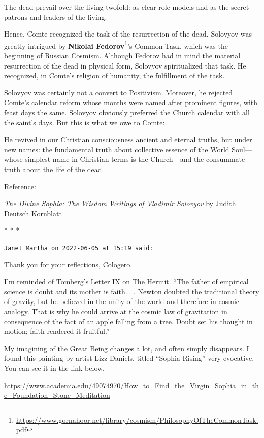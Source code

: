\begin{quotex}
The dead prevail over the living twofold: as clear role models and as the secret patrons and leaders of the living.
\end{quotex}


Hence, Comte recognized the task of the resurrection of the dead. Solovyov was greatly intrigued by \textbf{Nikolai Fedorov}\footnote{\url{https://www.gornahoor.net/library/cosmism/PhilosophyOfTheCommonTask.pdf}}'s Common Task, which was the beginning of Russian Cosmism. Although Fedorov had in mind the material resurrection of the dead in physical form, Solovyov spiritualized that task. He recognized, in Comte's religion of humanity, the fulfillment of the task.

Solovyov was certainly not a convert to Positivism. Moreover, he rejected Comte's calendar reform whose months were named after prominent figures, with feast days the same. Solovyov obviously preferred the Church calendar with all the saint's days. But this is what we owe to Comte:

\begin{quotex}
He revived in our Christian consciousness ancient and eternal truths, but under new names: the fundamental truth about collective essence of the World Soul---whose simplest name in Christian terms is the Church---and the consummate truth about the life of the dead.
\end{quotex}

Reference:

\textit{The Divine Sophia: The Wisdom Writings of Vladimir Solovyov} by Judith Deutsch Kornblatt



\begin{center}* * *\end{center}

\begin{footnotesize}
\begin{sffamily}
\texttt{Janet Martha on 2022-06-05 at 15:19 said:}

Thank you for your reflections, Cologero.

I'm reminded of Tomberg's Letter IX on The Hermit. ``The father of empirical science is doubt and its mother is faith... . Newton doubted the traditional theory of gravity, but he believed in the unity of the world and therefore in cosmic analogy. That is why he could arrive at the cosmic law of gravitation in consequence of the fact of an apple falling from a tree. Doubt set his thought in motion; faith rendered it fruitful.''

My imagining of the Great Being changes a lot, and often simply disappears. I found this painting by artist Lizz Daniels, titled ``Sophia Rising'' very evocative. You can see it in the link below.

\url{https://www.academia.edu/49074970/How\_to\_Find\_the\_Virgin\_Sophia\_in\_the\_Foundation\_Stone\_Meditation}


\end{sffamily}
\end{footnotesize}

